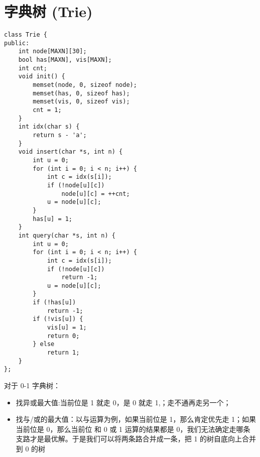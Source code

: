 \section{字典树 (Trie)}
\begin{verbatim}
class Trie {
public:
    int node[MAXN][30];
    bool has[MAXN], vis[MAXN];
    int cnt;
    void init() {
        memset(node, 0, sizeof node);
        memset(has, 0, sizeof has);
        memset(vis, 0, sizeof vis);
        cnt = 1;
    }
    int idx(char s) {
        return s - 'a';
    }
    void insert(char *s, int n) {
        int u = 0;
        for (int i = 0; i < n; i++) {
            int c = idx(s[i]);
            if (!node[u][c])
                node[u][c] = ++cnt;
            u = node[u][c];
        }
        has[u] = 1;
    }
    int query(char *s, int n) {
        int u = 0;
        for (int i = 0; i < n; i++) {
            int c = idx(s[i]);
            if (!node[u][c])
                return -1;
            u = node[u][c];
        }
        if (!has[u])
            return -1;
        if (!vis[u]) {
            vis[u] = 1;
            return 0;
        } else
            return 1;
    }
};
\end{verbatim}
对于 0-1 字典树：
\begin{itemize}
\item 找异或最大值:当前位是 1 就走 0，是 0 就走 1,；走不通再走另一个；
\item 找与/或的最大值：以与运算为例，如果当前位是 1，那么肯定优先走 1；如果当前位是 0，那么当前位 和 0 或 1 运算的结果都是 0，我们无法确定走哪条支路才是最优解。于是我们可以将两条路合并成一条，把 1 的树自底向上合并到 0 的树
\end{itemize}